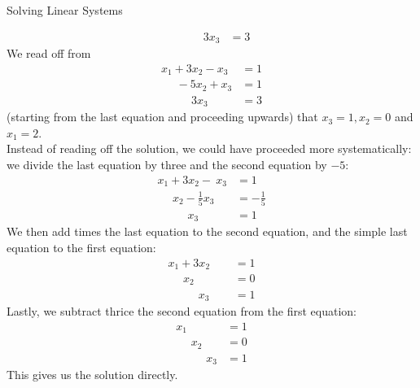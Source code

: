 \documentclass[smaller,hyperref={CJKbookmarks=true}]{beamer}
\begin{document}
\begin{frame}{Solving Linear Systems}
\begin{spacing}{1}
\begin{equation*}
\begin{split}
     ~~~~~~~~~~~~3x_3 &=3
  \end{split}
\end{equation*}
We read of{}f from
\begin{equation*}
  \begin{split}
     x_1+3x_2-x_3 &=1 \\
     ~~~~~~-5x_2+x_3 &=1 \\
     ~~~~~~~~~~~~3x_3 &=3
  \end{split}
\end{equation*}
(starting from the last equation and proceeding upwards) that $x_3=1,x_2=0$ and $x_1=2.$\\
Instead of reading of{}f the solution, we could have proceeded more
systematically: we divide the last equation by three and the second
equation by $-5$:
\begin{equation*}
  \begin{split}
     x_1+3x_2-~x_3 &=1 \\
     ~~~~~~x_2-\frac{1}{5}x_3 &=-\frac{1}{5} \\
     ~~~~~~~~~~~~x_3 &=1
  \end{split}
\end{equation*} \newpage
We then add  times the last equation to the second equation, and the simple last equation to the first equation:
\begin{equation*}
  \begin{split}
     x_1+3x_2~~~~~~ &=1 \\
     ~~~~~~x_2~~~~~~ &=0 \\
     ~~~~~~~~~~~~x_3 &=1
  \end{split}
\end{equation*}
Lastly, we subtract thrice the second equation from the first equation:
\begin{equation*}
  \begin{split}
     x_1~~~~~~~~~~~~ &=1 \\
     ~~~~~~x_2~~~~~~ &=0 \\
     ~~~~~~~~~~~~x_3 &=1
  \end{split}
\end{equation*}
This gives us the solution directly.
\end{spacing}
\end{frame}
\end{document}
